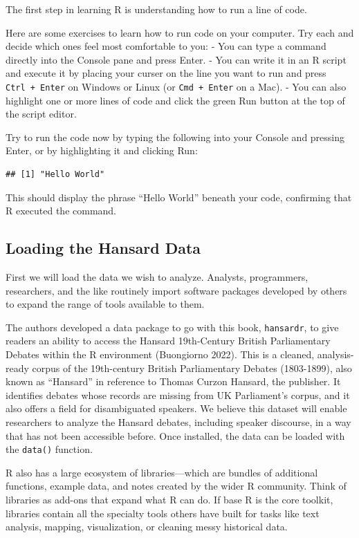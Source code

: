 \documentclass[
]{article}
\begin{document}
The first step in learning R is understanding how to run a line of code.

Here are some exercises to learn how to run code on your computer. Try
each and decide which ones feel most comfortable to you: - You can type
a command directly into the Console pane and press Enter. - You can
write it in an R script and execute it by placing your curser on the
line you want to run and press \texttt{Ctrl\ +\ Enter} on Windows or
Linux (or \texttt{Cmd\ +\ Enter} on a Mac). - You can also highlight one
or more lines of code and click the green Run button at the top of the
script editor.

Try to run the code now by typing the following into your Console and
pressing Enter, or by highlighting it and clicking Run:

\begin{verbatim}
## [1] "Hello World"
\end{verbatim}

This should display the phrase ``Hello World'' beneath your code,
confirming that R executed the command.

\subsection{Loading the Hansard Data}\label{loading-the-hansard-data}

First we will load the data we wish to analyze. Analysts, programmers,
researchers, and the like routinely import software packages developed
by others to expand the range of tools available to them.

The authors developed a data package to go with this book,
\texttt{hansardr}, to give readers an ability to access the Hansard
19th-Century British Parliamentary Debates within the R environment
(Buongiorno 2022). This is a cleaned, analysis-ready corpus of the
19th-century British Parliamentary Debates (1803-1899), also known as
``Hansard'' in reference to Thomas Curzon Hansard, the publisher. It
identifies debates whose records are missing from UK Parliament's
corpus, and it also offers a field for disambiguated speakers. We
believe this dataset will enable researchers to analyze the Hansard
debates, including speaker discourse, in a way that has not been
accessible before. Once installed, the data can be loaded with the
\texttt{data()} function.

R also has a large ecosystem of libraries---which are bundles of
additional functions, example data, and notes created by the wider R
community. Think of libraries as add-ons that expand what R can do. If
base R is the core toolkit, libraries contain all the specialty tools
others have built for tasks like text analysis, mapping, visualization,
or cleaning messy historical data.
\end{document}

